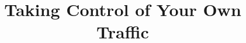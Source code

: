 \documentclass[format=sigconf,10pt,natbib=false,authordraft]{acmart}
\begin{document}
\title{Taking Control of Your Own Traffic }

\begin{sloppypar}

\maketitle







\end{sloppypar}
\end{document}
